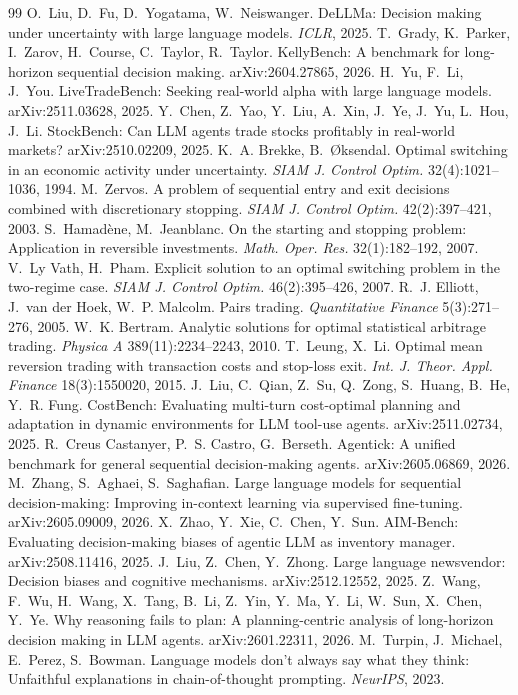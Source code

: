 \documentclass[10pt,a4paper,twocolumn]{article}
\begin{document}
\begin{thebibliography}{99}
 O.~Liu, D.~Fu, D.~Yogatama, W.~Neiswanger. DeLLMa: Decision making under uncertainty with large language models. \emph{ICLR}, 2025.
 T.~Grady, K.~Parker, I.~Zarov, H.~Course, C.~Taylor, R.~Taylor. KellyBench: A benchmark for long-horizon sequential decision making. arXiv:2604.27865, 2026.
 H.~Yu, F.~Li, J.~You. LiveTradeBench: Seeking real-world alpha with large language models. arXiv:2511.03628, 2025.
 Y.~Chen, Z.~Yao, Y.~Liu, A.~Xin, J.~Ye, J.~Yu, L.~Hou, J.~Li. StockBench: Can LLM agents trade stocks profitably in real-world markets? arXiv:2510.02209, 2025.
 K.~A. Brekke, B.~\O ksendal. Optimal switching in an economic activity under uncertainty. \emph{SIAM J. Control Optim.} 32(4):1021--1036, 1994.
 M.~Zervos. A problem of sequential entry and exit decisions combined with discretionary stopping. \emph{SIAM J. Control Optim.} 42(2):397--421, 2003.
 S.~Hamad\`ene, M.~Jeanblanc. On the starting and stopping problem: Application in reversible investments. \emph{Math. Oper. Res.} 32(1):182--192, 2007.
 V.~Ly Vath, H.~Pham. Explicit solution to an optimal switching problem in the two-regime case. \emph{SIAM J. Control Optim.} 46(2):395--426, 2007.
 R.~J. Elliott, J.~van der Hoek, W.~P. Malcolm. Pairs trading. \emph{Quantitative Finance} 5(3):271--276, 2005.
 W.~K. Bertram. Analytic solutions for optimal statistical arbitrage trading. \emph{Physica A} 389(11):2234--2243, 2010.
 T.~Leung, X.~Li. Optimal mean reversion trading with transaction costs and stop-loss exit. \emph{Int. J. Theor. Appl. Finance} 18(3):1550020, 2015.
 J.~Liu, C.~Qian, Z.~Su, Q.~Zong, S.~Huang, B.~He, Y.~R. Fung. CostBench: Evaluating multi-turn cost-optimal planning and adaptation in dynamic environments for LLM tool-use agents. arXiv:2511.02734, 2025.
 R.~Creus Castanyer, P.~S. Castro, G.~Berseth. Agentick: A unified benchmark for general sequential decision-making agents. arXiv:2605.06869, 2026.
 M.~Zhang, S.~Aghaei, S.~Saghafian. Large language models for sequential decision-making: Improving in-context learning via supervised fine-tuning. arXiv:2605.09009, 2026.
 X.~Zhao, Y.~Xie, C.~Chen, Y.~Sun. AIM-Bench: Evaluating decision-making biases of agentic LLM as inventory manager. arXiv:2508.11416, 2025.
 J.~Liu, Z.~Chen, Y.~Zhong. Large language newsvendor: Decision biases and cognitive mechanisms. arXiv:2512.12552, 2025.
 Z.~Wang, F.~Wu, H.~Wang, X.~Tang, B.~Li, Z.~Yin, Y.~Ma, Y.~Li, W.~Sun, X.~Chen, Y.~Ye. Why reasoning fails to plan: A planning-centric analysis of long-horizon decision making in LLM agents. arXiv:2601.22311, 2026.
 M.~Turpin, J.~Michael, E.~Perez, S.~Bowman. Language models don't always say what they think: Unfaithful explanations in chain-of-thought prompting. \emph{NeurIPS}, 2023.
\end{thebibliography}
\end{document}
